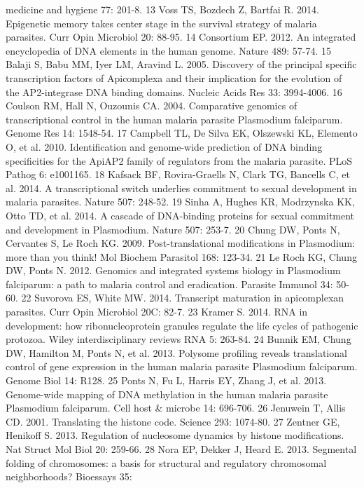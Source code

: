 medicine and hygiene 77: 201-8.
13  Voss TS, Bozdech Z, Bartfai R. 2014. Epigenetic memory takes center stage
in the survival strategy of malaria parasites. Curr Opin Microbiol 20: 88-95.
14  Consortium EP. 2012. An integrated encyclopedia of DNA elements in the
human genome. Nature 489: 57-74.
15  Balaji S, Babu MM, Iyer LM, Aravind L. 2005. Discovery of the principal
specific transcription factors of Apicomplexa and their implication for the
evolution of the AP2-integrase DNA binding domains. Nucleic Acids Res 33:
3994-4006.
16  Coulson RM, Hall N, Ouzounis CA. 2004. Comparative genomics of
transcriptional control in the human malaria parasite Plasmodium falciparum.
Genome Res 14: 1548-54.
17  Campbell TL, De Silva EK, Olszewski KL, Elemento O, et al. 2010.
Identification and genome-wide prediction of DNA binding specificities for the
ApiAP2 family of regulators from the malaria parasite. PLoS Pathog 6:
e1001165.
18  Kafsack BF, Rovira-Graells N, Clark TG, Bancells C, et al. 2014. A
transcriptional switch underlies commitment to sexual development in malaria
parasites. Nature 507: 248-52.
19  Sinha A, Hughes KR, Modrzynska KK, Otto TD, et al. 2014. A cascade of
DNA-binding proteins for sexual commitment and development in Plasmodium.
Nature 507: 253-7.
20  Chung DW, Ponts N, Cervantes S, Le Roch KG. 2009. Post-translational
modifications in Plasmodium: more than you think! Mol Biochem Parasitol 168:
123-34.
21  Le Roch KG, Chung DW, Ponts N. 2012. Genomics and integrated systems
biology in Plasmodium falciparum: a path to malaria control and eradication.
Parasite Immunol 34: 50-60.
22  Suvorova ES, White MW. 2014. Transcript maturation in apicomplexan
parasites. Curr Opin Microbiol 20C: 82-7.
23  Kramer S. 2014. RNA in development: how ribonucleoprotein granules
regulate the life cycles of pathogenic protozoa. Wiley interdisciplinary
reviews RNA 5: 263-84.
24  Bunnik EM, Chung DW, Hamilton M, Ponts N, et al. 2013. Polysome profiling
reveals translational control of gene expression in the human malaria parasite
Plasmodium falciparum. Genome Biol 14: R128.
25  Ponts N, Fu L, Harris EY, Zhang J, et al. 2013. Genome-wide mapping of DNA
methylation in the human malaria parasite Plasmodium falciparum. Cell host \&
microbe 14: 696-706.
26  Jenuwein T, Allis CD. 2001. Translating the histone code. Science 293:
1074-80.
27  Zentner GE, Henikoff S. 2013. Regulation of nucleosome dynamics by histone
modifications. Nat Struct Mol Biol 20: 259-66.
28  Nora EP, Dekker J, Heard E. 2013. Segmental folding of chromosomes: a
basis for structural and regulatory chromosomal neighborhoods? Bioessays 35:
